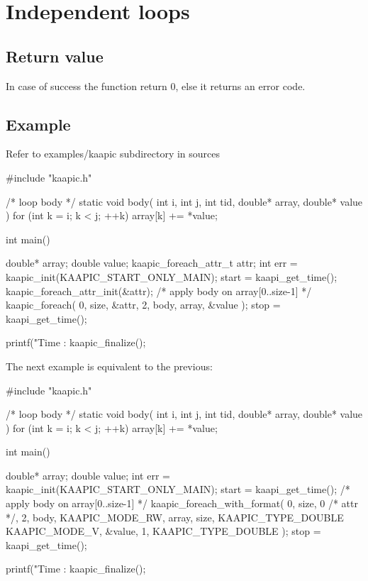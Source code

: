 \documentclass[a4paper, 11pt]{article}
\makeatletter
\newenvironment{apisection}[2][noshortnameprovided]{%
  \newpage
  \section{#2}
  \label{api@#1}
  \newcommand{\api@newpart}[4][noshortpartnameprovided]{%
    \newenvironment{##1}{%
      \subsection{##2}%
      \label{api@#1@##1}%
      ##3%
    }{##4}%
  }%
  \api@newpart[synopsis]{Synopsis}{}{}%
  \api@newpart[call]{Call}{}{}%
  \api@newpart[desc]{Description}{}{}%
  \api@newpart[params]{Parameters}{%
    \let\api@indesc\@empty
    \newcommand{\param}[1]{%
      \def\api@indesc{yes}%
      \begin{description}%
        \renewcommand{\param}[1]{\item[########1]}%
      \item[####1]
      }%
      \newenvironment{parameters}{%
        \begin{description}%
          \renewcommand{\param}[1]{\item[########1]}%
        }{%
        \end{description}%
      }
    }{%
      \ifx\api@indesc\@empty\relax\else%
    \end{description}%
    \fi%
  }%
  \api@newpart[ret]{Return value}{%
    \newcommand{\otherret}{\par\medskip\noindent}%
  }{}%
  \api@newpart[example]{Example}{}{}%
}{}
\makeatother
\begin{document}
\begin{apisection}[loop]{Independent loops}
  \begin{ret}
    In case of success the function return 0, else it returns an error
    code.
  \end{ret}
  \begin{example}
    Refer to examples/kaapic subdirectory in sources\\

    \begin{code}
  #include "kaapic.h"

  /* loop body */
  static void body(
    int i, int j, int tid, double* array, double* value
  ) 
  {
    for (int k = i; k < j; ++k)
      array[k] += *value;
  }

  int main()
  {
    double* array;
    double value;
    kaapic_foreach_attr_t attr;
    int err = kaapic_init(KAAPIC_START_ONLY_MAIN);
    start = kaapi_get_time(); 
    kaapic_foreach_attr_init(&attr);
    /* apply body on array[0..size-1] */
    kaapic_foreach( 0, size, &attr, 2, body, array, &value );
    stop = kaapi_get_time(); 

    printf("Time : %
    kaapic_finalize();
  }
    \end{code}

    The next example is equivalent to the previous:
    \begin{code}
  #include "kaapic.h"

  /* loop body */
  static void body(
    int i, int j, int tid, double* array, double* value
  ) 
  {
    for (int k = i; k < j; ++k)
      array[k] += *value;
  }

  int main()
  {
    double* array;
    double value;
    int err = kaapic_init(KAAPIC_START_ONLY_MAIN);
    start = kaapi_get_time(); 
    /* apply body on array[0..size-1] */
    kaapic_foreach_with_format( 0, size, 0 /* attr */, 2, body, 
        KAAPIC_MODE_RW, array, size, KAAPIC_TYPE_DOUBLE
        KAAPIC_MODE_V, &value, 1,  KAAPIC_TYPE_DOUBLE
    );
    stop = kaapi_get_time(); 

    printf("Time : %
    kaapic_finalize();
  }
    \end{code}
  \end{example}
\end{apisection}
\end{document}
